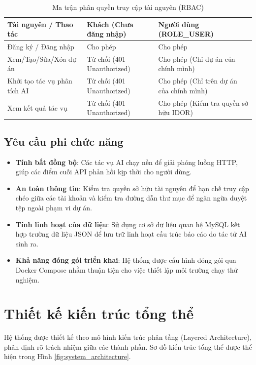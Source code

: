 \documentclass[12pt,a4paper]{report}
\begin{document}
\begin{table}[H]
\centering
\caption{Ma trận phân quyền truy cập tài nguyên (RBAC)}
\label{tab:rbac_matrix}
\renewcommand{\arraystretch}{1.2}
\begin{tabular}{|p{4.5cm}|p{3.5cm}|p{3.5cm}|}
\hline
\textbf{Tài nguyên / Thao tác} & \textbf{Khách (Chưa đăng nhập)} & \textbf{Người dùng (ROLE\_USER)} \\ \hline
Đăng ký / Đăng nhập & Cho phép & Cho phép \\ \hline
Xem/Tạo/Sửa/Xóa dự án & Từ chối (401 Unauthorized) & Cho phép (Chỉ dự án của chính mình) \\ \hline
Khởi tạo tác vụ phân tích AI & Từ chối (401 Unauthorized) & Cho phép (Chỉ trên dự án của chính mình) \\ \hline
Xem kết quả tác vụ & Từ chối (401 Unauthorized) & Cho phép (Kiểm tra quyền sở hữu IDOR) \\ \hline
\end{tabular}
\end{table}

\subsection{Yêu cầu phi chức năng}
\begin{itemize}
    \item \textbf{Tính bất đồng bộ}: Các tác vụ AI chạy nền để giải phóng luồng HTTP, giúp các điểm cuối API phản hồi kịp thời cho người dùng.
    \item \textbf{An toàn thông tin}: Kiểm tra quyền sở hữu tài nguyên để hạn chế truy cập chéo giữa các tài khoản và kiểm tra đường dẫn thư mục để ngăn ngừa duyệt tệp ngoài phạm vi dự án.
    \item \textbf{Tính linh hoạt của dữ liệu}: Sử dụng cơ sở dữ liệu quan hệ MySQL kết hợp trường dữ liệu JSON để lưu trữ linh hoạt cấu trúc báo cáo do tác tử AI sinh ra.
    \item \textbf{Khả năng đóng gói triển khai}: Hệ thống được cấu hình đóng gói qua Docker Compose nhằm thuận tiện cho việc thiết lập môi trường chạy thử nghiệm.
\end{itemize}

\section{Thiết kế kiến trúc tổng thể}
Hệ thống được thiết kế theo mô hình kiến trúc phân tầng (Layered Architecture), phân định rõ trách nhiệm giữa các thành phần. Sơ đồ kiến trúc tổng thể được thể hiện trong Hình \ref{fig:system_architecture}.
\end{document}
